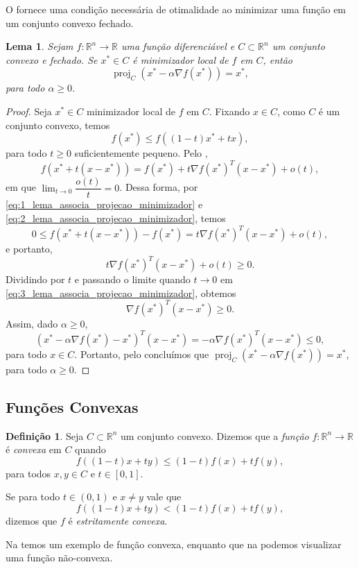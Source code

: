 \documentclass[12pt,a4paper]{scrartcl}
\DeclareMathOperator{\proj}{proj}
\def\RR{\mathds{R}}
\newtheorem{lema}{Lema}
\theoremstyle{definition}%
\newtheorem{defi}{Definição}
\begin{document}
O  fornece uma condição necessária de otimalidade ao minimizar uma função em um conjunto convexo fechado.


\begin{lema} \label{lema:associa_projecao_minimizador}
Sejam $f: \RR^{n} \rightarrow \RR$ uma função diferenciável e $C \subset \RR^{n}$ um conjunto convexo e fechado. Se $x^{*} \in C$ é minimizador local de $f$ em $C$, então
\[
\proj_{C} (x^{*} - \alpha \nabla f(x^{*})) = x^{*} ,
\]
para todo $\alpha \geq 0$.
\end{lema}
\begin{proof}
Seja $x^{*} \in C$ minimizador local de $f$ em $C$. Fixando $x\in C$, como $C$ é um conjunto convexo, temos
\[ \label{eq:1_lema_associa_projecao_minimizador}
f(x^{*}) \leq f((1-t)x^{*} + tx),
\]
para todo $t\geq 0$ suficientemente pequeno. Pelo , 
\[ \label{eq:2_lema_associa_projecao_minimizador}
f(x^{*}+t(x-x^{*})) = f(x^{*}) + t\nabla f(x^{*})^{T}(x-x^{*}) + o(t) ,
\]
em que $\displaystyle\lim_{t\rightarrow 0} \dfrac{o(t)}{t} = 0$. Dessa forma, por \eqref{eq:1_lema_associa_projecao_minimizador} e \eqref{eq:2_lema_associa_projecao_minimizador}, temos
\[
0 \leq f(x^{*}+t(x-x^{*})) - f(x^{*}) = t\nabla f(x^{*})^{T}(x-x^{*}) + o(t) ,
\]
e portanto, 
\[ \label{eq:3_lema_associa_projecao_minimizador}
t\nabla f(x^{*})^{T}(x-x^{*}) + o(t) \geq 0.
\]
Dividindo por $t$ e passando o limite quando $t \rightarrow 0$ em \eqref{eq:3_lema_associa_projecao_minimizador}, obtemos
\[
\nabla f(x^{*})^{T}(x-x^{*}) \geq 0.
\]
Assim, dado $\alpha \geq 0$,
\[
(x^{*} - \alpha \nabla f(x^{*}) - x^{*})^{T}(x-x^{*}) = -\alpha \nabla f(x^{*})^{T}(x-x^{*}) \leq 0,
\]
para todo $x\in C$. Portanto, pelo  concluímos que $\proj_{C} (x^{*} - \alpha \nabla f(x^{*})) = x^{*}$, para todo $\alpha \geq 0$.
\end{proof}




\subsection{Funções Convexas}

\begin{defi} \label{defi:funcao_convexa}
Seja $C \subset \RR^{n}$ um conjunto convexo. Dizemos que a \emph{função} $f: \RR^{n} \rightarrow \RR$ é \emph{convexa} em $C$ quando
\[
f((1-t)x + ty) \leq (1-t)f(x) + tf(y),
\]
para todos $x,y \in C$ e $t \in [0,1]$.

Se para todo $t \in (0,1)$ e $x \neq y$ vale que
\[
f((1-t)x + ty) < (1-t)f(x) + tf(y),
\]
dizemos que $f$ é \emph{estritamente convexa}.
\end{defi}
Na  temos um exemplo de função convexa, enquanto que na  podemos visualizar uma função não-convexa.
\end{document}
